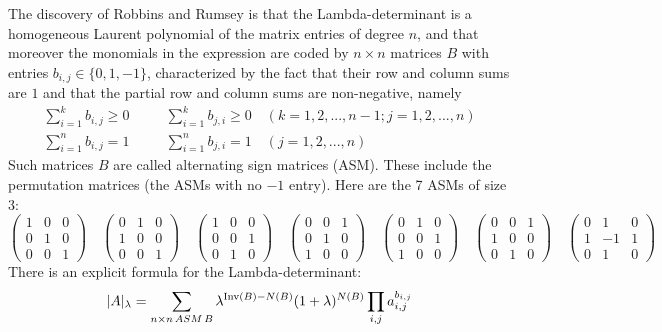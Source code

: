 \documentclass[12pt]{amsart}
\numberwithin{equation}{section}
\begin{document}
The discovery of Robbins and Rumsey is that the Lambda-determinant is a homogeneous
Laurent polynomial of the matrix entries of degree $n$, and that moreover the monomials
in the expression are coded by $n\times n$ matrices $B$ with entries $b_{i,j}\in \{0,1,-1\}$, characterized by the fact that
their row and column sums are $1$ and that the partial row and column sums are non-negative, namely
\begin{eqnarray*} \sum_{i=1}^k b_{i,j} \geq 0 & & \quad \sum_{i=1}^k b_{j,i}\geq 0\quad (k=1,2,...,n-1;j=1,2,...,n)\\
 \sum_{i=1}^n b_{i,j} = 1 & & \quad \sum_{i=1}^n b_{j,i}=1\quad (j=1,2,...,n)
\end{eqnarray*}
Such matrices $B$ are called alternating sign matrices (ASM). These include the permutation matrices (the ASMs
with no $-1$ entry). Here are the 7 ASMs of size 3:
$$ \begin{pmatrix}1 &0&0\\0&1&0\\0&0&1\end{pmatrix}\quad
\begin{pmatrix}0 &1&0\\1&0&0\\0&0&1\end{pmatrix}\quad
\begin{pmatrix}1 &0&0\\0&0&1\\0&1&0\end{pmatrix}\quad
\begin{pmatrix}0 &0&1\\0&1&0\\1&0&0\end{pmatrix}\quad
\begin{pmatrix}0 &1&0\\0&0&1\\1&0&0\end{pmatrix}\quad
\begin{pmatrix}0 &0&1\\1&0&0\\0&1&0\end{pmatrix}\quad
\begin{pmatrix}0&1&0\\1&-1&1\\0&1&0\end{pmatrix}$$
There is an explicit formula for the Lambda-determinant\cite{RR}:
\begin{equation}\label{lambdadet}
\vert A\vert_\lambda=\sum_{n\times n\, ASM\, B} \lambda^{{\rm Inv}(B)-N(B)} (1+\lambda)^{N(B)}\prod_{i,j} a_{i,j}^{b_{i,j}}
\end{equation}
\end{document}
